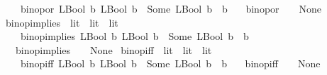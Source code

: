 \begin{isabellebody}
\ \ \ \ {\isachardoublequoteopen}binop{\isacharunderscore}{\kern0pt}or\ {\isacharparenleft}{\kern0pt}LBool\ b{}{\isacharparenright}{\kern0pt}\ {\isacharparenleft}{\kern0pt}LBool\ b{}{\isacharparenright}{\kern0pt}\ {\isacharequal}{\kern0pt}\ Some\ {\isacharparenleft}{\kern0pt}LBool\ {\isacharparenleft}{\kern0pt}b{}\ {\isasymor}\ b{}{\isacharparenright}{\kern0pt}{\isacharparenright}{\kern0pt}{\isachardoublequoteclose}\isanewline
\ \ {\isacharbar}{\kern0pt}\ {\isachardoublequoteopen}binop{\isacharunderscore}{\kern0pt}or\ {\isacharunderscore}{\kern0pt}\ {\isacharunderscore}{\kern0pt}\ {\isacharequal}{\kern0pt}\ None{\isachardoublequoteclose}\isanewline
\isanewline
{}\isamarkupfalse%
\ binop{\isacharunderscore}{\kern0pt}implies\ {\isacharcolon}{\kern0pt}{\isacharcolon}{\kern0pt}\ {\isachardoublequoteopen}lit\ {\isasymRightarrow}\ lit\ {\isasymrightharpoonup}\ lit{\isachardoublequoteclose}\isanewline
\ \ \isanewline
\ \ \ \ {\isachardoublequoteopen}binop{\isacharunderscore}{\kern0pt}implies\ {\isacharparenleft}{\kern0pt}LBool\ b{}{\isacharparenright}{\kern0pt}\ {\isacharparenleft}{\kern0pt}LBool\ b{}{\isacharparenright}{\kern0pt}\ {\isacharequal}{\kern0pt}\ Some\ {\isacharparenleft}{\kern0pt}LBool\ {\isacharparenleft}{\kern0pt}b{}\ {\isasymlongrightarrow}\ b{}{\isacharparenright}{\kern0pt}{\isacharparenright}{\kern0pt}{\isachardoublequoteclose}\isanewline
\ \ {\isacharbar}{\kern0pt}\ {\isachardoublequoteopen}binop{\isacharunderscore}{\kern0pt}implies\ {\isacharunderscore}{\kern0pt}\ {\isacharunderscore}{\kern0pt}\ {\isacharequal}{\kern0pt}\ None{\isachardoublequoteclose}\isanewline
\isanewline
{}\isamarkupfalse%
\ binop{\isacharunderscore}{\kern0pt}iff\ {\isacharcolon}{\kern0pt}{\isacharcolon}{\kern0pt}\ {\isachardoublequoteopen}lit\ {\isasymRightarrow}\ lit\ {\isasymrightharpoonup}\ lit{\isachardoublequoteclose}\isanewline
\ \ \isanewline
\ \ \ \ {\isachardoublequoteopen}binop{\isacharunderscore}{\kern0pt}iff\ {\isacharparenleft}{\kern0pt}LBool\ b{}{\isacharparenright}{\kern0pt}\ {\isacharparenleft}{\kern0pt}LBool\ b{}{\isacharparenright}{\kern0pt}\ {\isacharequal}{\kern0pt}\ Some\ {\isacharparenleft}{\kern0pt}LBool\ {\isacharparenleft}{\kern0pt}b{}\ {\isacharequal}{\kern0pt}\ b{}{\isacharparenright}{\kern0pt}{\isacharparenright}{\kern0pt}{\isachardoublequoteclose}\isanewline
\ \ {\isacharbar}{\kern0pt}\ {\isachardoublequoteopen}binop{\isacharunderscore}{\kern0pt}iff\ {\isacharunderscore}{\kern0pt}\ {\isacharunderscore}{\kern0pt}\ {\isacharequal}{\kern0pt}\ None{\isachardoublequoteclose}\isanewline

\end{isabellebody}
